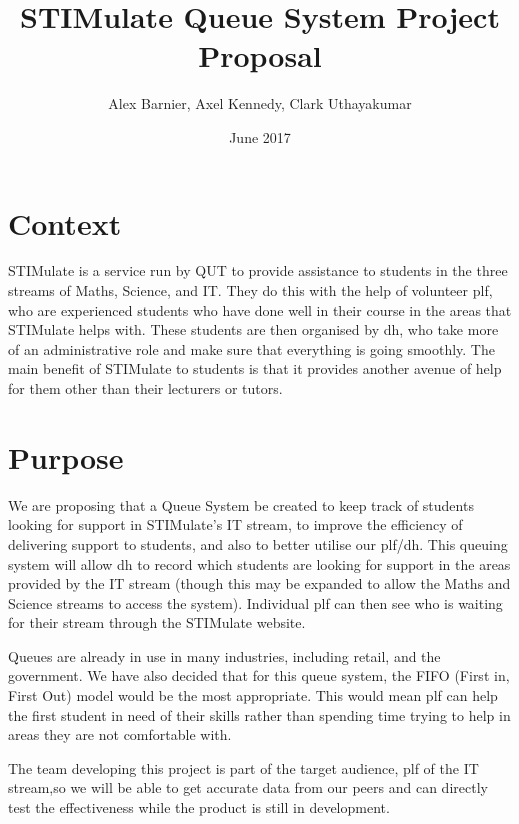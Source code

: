 \documentclass{article}
\begin{document}
	\title{STIMulate Queue System Project Proposal}
	\author{Alex Barnier, Axel Kennedy, Clark Uthayakumar}
	\date{June 2017}
	\maketitle
	
\section{Context}
{
	STIMulate is a service run by QUT to provide assistance to students in the three streams of Maths, Science, and IT. They do this with the help of volunteer \ac{plf}, who are experienced students who have done well in their course in the areas that STIMulate helps with. These students are then organised by \ac{dh}, who take more of an administrative role and make sure that everything is going smoothly. The main benefit of STIMulate to students is that it provides another avenue of help for them other than their lecturers or tutors.
}  
\section{Purpose}
{
	We are proposing that a Queue System be created to keep track of students looking for support in STIMulate's IT stream, to improve the efficiency of delivering support to students, and also to better utilise our \ac{plf}/\ac{dh}. This queuing system will allow \ac{dh} to record which students are looking for support in the areas provided by the IT stream (though this may be expanded to allow the Maths and Science streams to access the system). Individual \ac{plf} can then see who is waiting for their stream through the STIMulate website. 

	Queues are already in use in many industries, including retail, and the government. We have also decided that for this queue system, the FIFO (First in, First Out) model would be the most appropriate. This would mean \ac{plf} can help the first student in need of their skills rather than spending time trying to help in areas they are not comfortable with.

	The team developing this project is part of the target audience, \ac{plf} of the IT stream,so we will be able to get accurate data from our peers and can directly test the effectiveness while the product is still in development.
}
\end{document}

